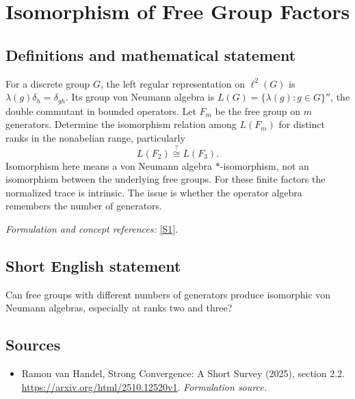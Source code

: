 \documentclass[11pt]{article}
\begin{document}
\section*{\texorpdfstring{Isomorphism of Free Group Factors}{Isomorphism of Free Group Factors}}\label{30001752}
\subsection{Definitions and mathematical statement}
For a discrete group $G$, the left regular representation on $\ell^2(G)$ is $\lambda(g)\delta_h=\delta_{gh}$. Its group von Neumann algebra is
$L(G)=\{\lambda(g):g\in G\}''$, the double commutant in bounded operators. Let $F_m$ be the free group on $m$ generators. Determine the isomorphism relation among $L(F_m)$ for distinct ranks in the nonabelian range, particularly
\[
 L(F_2)\stackrel{?}{\cong}L(F_3).
\]
Isomorphism here means a von Neumann algebra $*$-isomorphism, not an isomorphism between the underlying free groups. For these finite factors the normalized trace is intrinsic. The issue is whether the operator algebra remembers the number of generators.
\par\smallskip\textit{Formulation and concept references:} \href{https://arxiv.org/html/2510.12520v1}{[S1]}.

\subsection{Short English statement}
Can free groups with different numbers of generators produce isomorphic von Neumann algebras, especially at ranks two and three?
\subsection{Sources}
\begin{itemize}
\item[S1]Ramon van Handel, Strong Convergence: A Short Survey (2025), section 2.2.
\url{https://arxiv.org/html/2510.12520v1}.
\textit{Formulation source.}
\end{itemize}
\end{document}
